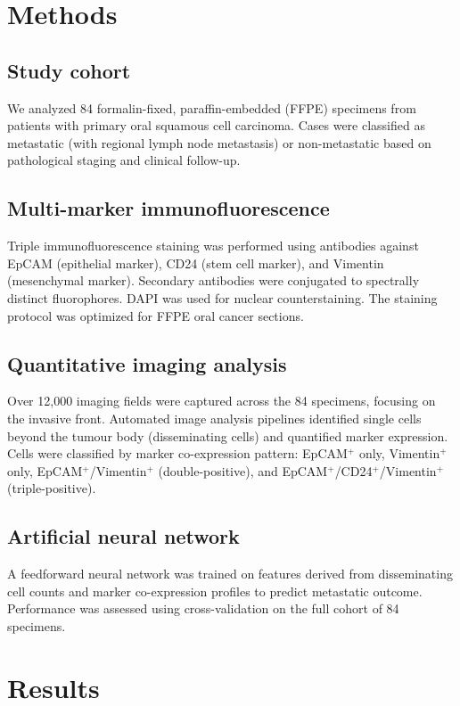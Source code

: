 \documentclass[11pt]{article}
\begin{document}
\section{Methods}

\subsection{Study cohort}
We analyzed 84 formalin-fixed, paraffin-embedded (FFPE) specimens from patients with primary oral squamous cell carcinoma. Cases were classified as metastatic (with regional lymph node metastasis) or non-metastatic based on pathological staging and clinical follow-up.

\subsection{Multi-marker immunofluorescence}
Triple immunofluorescence staining was performed using antibodies against EpCAM (epithelial marker), CD24 (stem cell marker), and Vimentin (mesenchymal marker). Secondary antibodies were conjugated to spectrally distinct fluorophores. DAPI was used for nuclear counterstaining. The staining protocol was optimized for FFPE oral cancer sections.

\subsection{Quantitative imaging analysis}
Over 12,000 imaging fields were captured across the 84 specimens, focusing on the invasive front. Automated image analysis pipelines identified single cells beyond the tumour body (disseminating cells) and quantified marker expression. Cells were classified by marker co-expression pattern: EpCAM$^+$ only, Vimentin$^+$ only, EpCAM$^+$/Vimentin$^+$ (double-positive), and EpCAM$^+$/CD24$^+$/Vimentin$^+$ (triple-positive).

\subsection{Artificial neural network}
A feedforward neural network was trained on features derived from disseminating cell counts and marker co-expression profiles to predict metastatic outcome. Performance was assessed using cross-validation on the full cohort of 84 specimens.

\section{Results}
\end{document}
